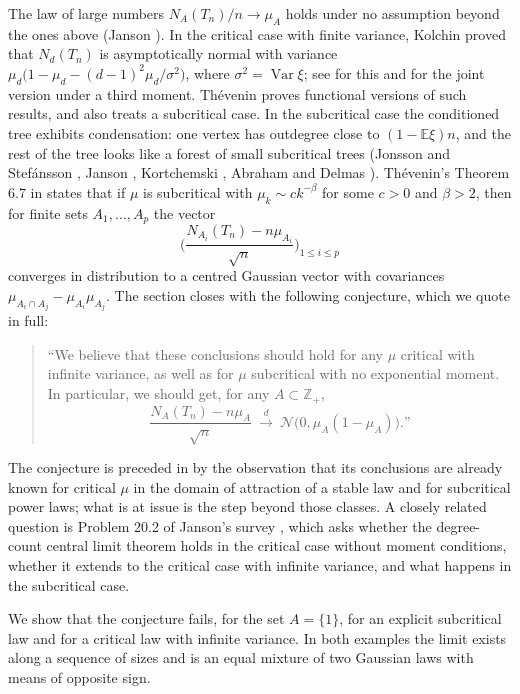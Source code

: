 \documentclass[11pt]{amsart}
\theoremstyle{definition}
\newcommand{\Z}{\mathbb{Z}}
\newcommand{\E}{\mathbb{E}}
\newcommand{\Nor}{\mathcal{N}}
\DeclareMathOperator{\Var}{Var}
\begin{document}
The law of large numbers $N_A(T_n)/n\to\mu_A$ holds under no assumption beyond the ones above (Janson \cite[Theorem 7.11]{Janson12}). In the critical case with finite variance, Kolchin \cite[Theorem 2.3.1]{Kolchin} proved that $N_d(T_n)$ is asymptotically normal with variance $\mu_d\big(1-\mu_d-(d-1)^2\mu_d/\sigma^2\big)$, where $\sigma^2=\Var\xi$; see \cite[(20.5)--(20.7)]{Janson12} for this and for the joint version under a third moment. Th\'evenin \cite{Thevenin} proves functional versions of such results, and also treats a subcritical case. In the subcritical case the conditioned tree exhibits condensation: one vertex has outdegree close to $(1-\E\xi)n$, and the rest of the tree looks like a forest of small subcritical trees (Jonsson and Stef\'ansson \cite{JS}, Janson \cite[Section 19]{Janson12}, Kortchemski \cite{Kortchemski}, Abraham and Delmas \cite{AD}). Th\'evenin's Theorem 6.7 in \cite{Thevenin} states that if $\mu$ is subcritical with $\mu_k\sim ck^{-\beta}$ for some $c>0$ and $\beta>2$, then for finite sets $A_1,\dots,A_p$ the vector
\[
\Big(\frac{N_{A_i}(T_n)-n\mu_{A_i}}{\sqrt n}\Big)_{1\le i\le p}
\]
converges in distribution to a centred Gaussian vector with covariances $\mu_{A_i\cap A_j}-\mu_{A_i}\mu_{A_j}$. The section closes with the following conjecture, which we quote in full:

\begin{quote}
``We believe that these conclusions should hold for any $\mu$ critical with infinite variance, as well as for $\mu$ subcritical with no exponential moment. In particular, we should get, for any $A\subset\Z_+$,
\[
\frac{N_A(T_n)-n\mu_A}{\sqrt n}\ \xrightarrow{d}\ \Nor\big(0,\mu_A(1-\mu_A)\big).\text{''}
\]
\end{quote}

The conjecture is preceded in \cite{Thevenin} by the observation that its conclusions are already known for critical $\mu$ in the domain of attraction of a stable law and for subcritical power laws; what is at issue is the step beyond those classes. A closely related question is Problem 20.2 of Janson's survey \cite{Janson12}, which asks whether the degree-count central limit theorem holds in the critical case without moment conditions, whether it extends to the critical case with infinite variance, and what happens in the subcritical case.

We show that the conjecture fails, for the set $A=\{1\}$, for an explicit subcritical law and for a critical law with infinite variance. In both examples the limit exists along a sequence of sizes and is an equal mixture of two Gaussian laws with means of opposite sign.
\end{document}
